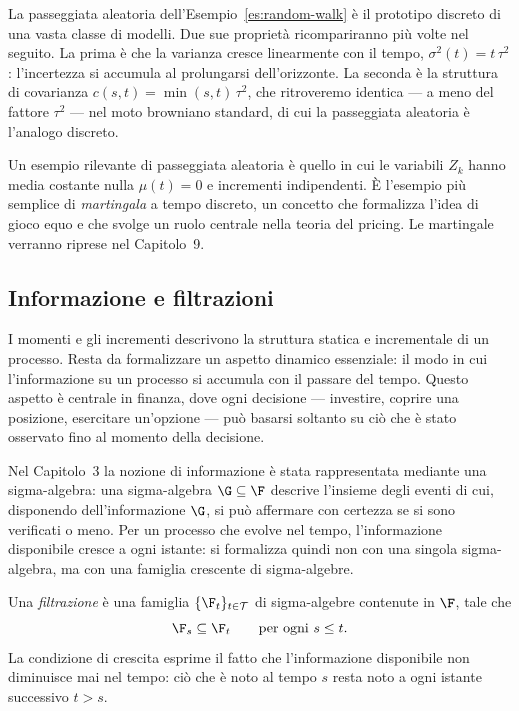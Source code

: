La passeggiata aleatoria dell'Esempio~\ref{es:random-walk} \`{e} il
prototipo discreto di una vasta classe di modelli. Due sue
propriet\`{a} ricompariranno pi\`{u} volte nel seguito. La prima \`{e}
che la varianza cresce linearmente con il tempo, $\sigma^2(t)=t\,
\tau^2$: l'incertezza si accumula al prolungarsi dell'orizzonte. La
seconda \`{e} la struttura di covarianza $c(s,t)=\min(s,t)\,\tau^2$,
che ritroveremo identica --- a meno del fattore $\tau^2$ --- nel moto
browniano standard, di cui la passeggiata aleatoria \`{e} l'analogo
discreto.

\begin{remark}
Un esempio rilevante di passeggiata aleatoria \`{e} quello in cui le variabili $Z_k$ hanno media costante nulla $\mu(t)=0$ e incrementi
indipendenti. \`{E} l'esempio pi\`{u} semplice di \emph{martingala}
a tempo discreto, un concetto che formalizza l'idea di gioco equo e
che svolge un ruolo centrale nella teoria del pricing. Le 
martingale
verranno riprese nel Capitolo~9.
\end{remark}

\subsection{Informazione e filtrazioni}

\noindent
I momenti e gli incrementi descrivono la struttura statica e
incrementale di un processo. Resta da formalizzare un aspetto
dinamico essenziale: il modo in cui l'informazione su un processo si
accumula con il passare del tempo. Questo aspetto \`{e} centrale in
finanza, dove ogni decisione --- investire, coprire una posizione,
esercitare un'opzione --- pu\`{o} basarsi soltanto su ci\`{o} che
\`{e} stato osservato fino al momento della decisione.

Nel Capitolo~3 la nozione di informazione \`{e} stata rappresentata
mediante una sigma-algebra: una sigma-algebra $\G\subseteq\F$ descrive
l'insieme degli eventi di cui, disponendo dell'informazione $\G$, si
pu\`{o} affermare con certezza se si sono verificati o meno. Per un
processo che evolve nel tempo, l'informazione disponibile cresce a
ogni istante: si formalizza quindi non con una singola sigma-algebra,
ma con una famiglia crescente di sigma-algebre.

\begin{definition}
\label{def:filtrazione}
Una \emph{filtrazione} \`{e} una famiglia $\{\F_t\}_{t\in\mathcal{T}}$
di sigma-algebre contenute in $\F$, tale che
\[
\F_s\subseteq\F_t \qquad \text{per ogni } s\leq t.
\]
La condizione di crescita esprime il fatto che l'informazione
disponibile non diminuisce mai nel tempo: ci\`{o} che \`{e} noto al
tempo $s$ resta noto a ogni istante successivo $t>s$.
\end{definition}

